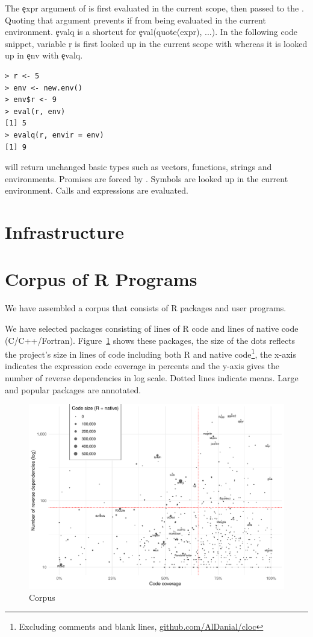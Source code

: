 \documentclass[conference]{IEEEtran}
\begin{document}
The \c{expr} argument of \eval is first evaluated in the current scope, then passed to the \eval. Quoting that argument prevents if from being evaluated in the current environment. \c{evalq} is a shortcut for \c{eval(quote(expr), ...)}. In the following code snippet, variable \c{r} is first looked up in the current scope with \eval whereas it is looked up in \c{env} with \c{evalq}.

\begin{lstlisting}
> r <- 5
> env <- new.env()
> env$r <- 9
> eval(r, env)
[1] 5
> evalq(r, envir = env)
[1] 9
\end{lstlisting}

\eval will return unchanged basic types such as vectors, functions, strings and environments. Promises are forced by \eval. Symbols are looked up in the current environment. Calls and expressions are evaluated. 

\section{Infrastructure}


\section{Corpus of R Programs}

We have assembled a corpus that consists of \CorpusPackages R packages and user programs.

We have selected \CorpusPackages packages consisting of \CorpusRCodeRnd
lines of R code and \CorpusNativeCodeRnd lines of native code
(C/C++/Fortran).  Figure~\ref{fig:corpus} shows these packages, the size of
the dots reflects the project's size in lines of code including both R and
native code\footnote{Excluding comments and blank lines,
  \url{github.com/AlDanial/cloc}}, the x-axis indicates the expression code
coverage in percents and the y-axis gives the number of reverse dependencies
in log scale. Dotted lines indicate means. Large and popular packages are
annotated.

\begin{figure}[!tb]\centering\includegraphics[width=.9\linewidth]
  {corpus.pdf}\caption{Corpus}\label{fig:corpus}
\end{figure}
\end{document}
